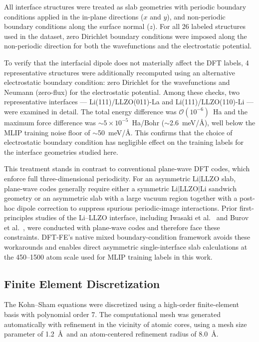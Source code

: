 \documentclass[12pt,a4paper,oneside]{book}
\begin{document}
All interface structures were treated as slab geometries with periodic
boundary conditions applied in the in-plane directions ($x$ and $y$),
and non-periodic boundary conditions along the surface normal ($z$).
For all 26 labeled structures used in the dataset, zero Dirichlet
boundary conditions were imposed along the non-periodic direction for
both the wavefunctions and the electrostatic potential.

To verify that the interfacial dipole does not materially affect the
DFT labels, 4 representative structures were additionally recomputed
using an alternative electrostatic boundary condition: zero Dirichlet
for the wavefunctions and Neumann (zero-flux) for the electrostatic
potential. Among these checks, two representative interfaces ---
Li(111)/LLZO(011)-La and Li(111)/LLZO(110)-Li --- were examined in
detail. The total energy difference was $\mathcal{O}(10^{-6})$~Ha and
the maximum force difference was $\sim 5\times10^{-5}$~Ha/Bohr
($\sim$2.6~meV/\AA), well below the MLIP training noise floor of
$\sim$50~meV/\AA. This confirms that the choice of electrostatic
boundary condition has negligible effect on the training labels for the
interface geometries studied here.

This treatment stands in contrast to conventional plane-wave DFT codes,
which enforce full three-dimensional periodicity. For an asymmetric
Li$|$LLZO slab, plane-wave codes generally require either a symmetric
Li$|$LLZO$|$Li sandwich geometry or an asymmetric slab with a large
vacuum region together with a post-hoc dipole correction to suppress
spurious periodic-image interactions. Prior first-principles studies of
the Li--LLZO interface, including Iwasaki et
al.~\cite{Iwasaki2022DFT_Li_LLZO_PSSB} and Burov et
al.~\cite{Burov2024LiLLZOChargeTransfer}, were conducted with
plane-wave codes and therefore face these constraints. DFT-FE's native
mixed boundary-condition framework avoids these workarounds and enables
direct asymmetric single-interface slab calculations at the 450--1500
atom scale used for MLIP training labels in this work.
\subsection{Finite Element Discretization}

The Kohn--Sham equations were discretized using a high-order finite-element basis with polynomial order 7. The computational mesh was generated automatically with refinement in the vicinity of atomic cores, using a mesh size parameter of 1.2~\AA\ and an atom-centered refinement radius of 8.0~\AA.
\end{document}
